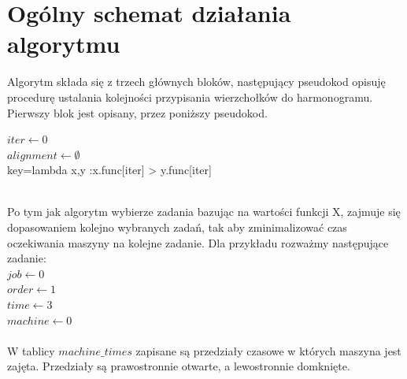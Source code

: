 \documentclass[11pt,twocolumn]{article}
\begin{document}
\section{Ogólny schemat działania algorytmu}
Algorytm składa się z trzech głównych bloków, następujący pseudokod opisuję procedurę ustalania kolejności przypisania wierzchołków do harmonogramu. Pierwszy blok jest opisany, przez poniższy pseudokod.
\begin{algorithm}
\DontPrintSemicolon
$iter \longleftarrow 0$\\
$alignment \longleftarrow \emptyset$\\
key=lambda x,y :x.func[iter] > y.func[iter] \\
\end{algorithm}
\\
Po tym jak algorytm wybierze zadania bazując na wartości funkcji X, zajmuje się dopasowaniem kolejno wybranych zadań, tak aby zminimalizować czas oczekiwania maszyny na kolejne zadanie.
Dla przykładu rozważmy następujące zadanie:\\

$job \longleftarrow 0$ \\
$order \longleftarrow 1$ \\
$time \longleftarrow 3$ \\
$machine \longleftarrow 0$ \\
\\
W tablicy $machine\_times$ zapisane są przedziały czasowe w których maszyna  jest zajęta. Przedziały są prawostronnie otwarte, a lewostronnie domknięte. 
\end{document}
